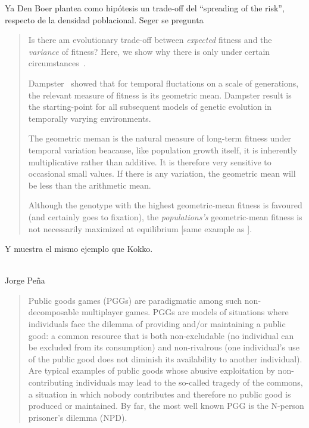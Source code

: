 \documentclass[a4paper,10pt]{article}
\begin{document}
Ya Den Boer plantea como hipótesis un trade-off del ``spreading of the risk'', respecto de la densidad poblacional.
Seger se pregunta
\begin{quotation}
    Is there am evolutionary trade-off between \emph{expected} fitness and the \emph{variance} of fitness?
    Here, we show why there is only under certain circumstances~\cite{seger1987-betHedging}.

    Dampster~\cite{dempster1955-geometricMean} showed that for temporal fluctations on a scale of generations, the relevant measure of fitness is its geometric mean.
    Dampster result is the starting-point for all subsequent models of genetic evolution in temporally varying environments.

    The geometric meman is the natural measure of long-term fitness under temporal variation beacause, like population growth itself, it is inherently multiplicative rather than additive.
    It is therefore very sensitive to occasional small values.
    If there is any variation, the geometric mean will be less than the arithmetic mean.

    Although the genotype with the highest geometric-mean fitness is favoured (and certainly goes to fixation), the \emph{populations's} geometric-mean fitness is not necessarily maximized at equilibrium [same example as \cite{starrfelt2012-bet}].
\end{quotation}
Y muestra el mismo ejemplo que Kokko.

\\

Jorge Peña
\begin{quotation}
    Public goods games (PGGs) are paradigmatic among such non-decomposable multiplayer games.
    PGGs are models of situations where individuals face the dilemma of providing and/or maintaining a public good: a common resource that is both non-excludable (no individual can be excluded from its consumption) and non-rivalrous (one individual’s use of the public good does not diminish its availability to another individual).
    Are typical examples of public goods whose abusive exploitation by non-contributing individuals may lead to the so-called tragedy of the commons, a situation in which nobody contributes and therefore no public good is produced or maintained.
    By far, the most well known PGG is the N-person prisoner’s dilemma (NPD). \cite{pena2012-phd}
\end{quotation}


{\footnotesize


}
\end{document}
